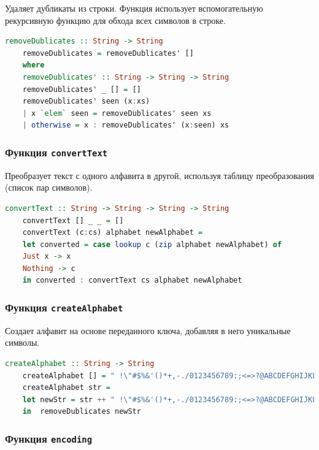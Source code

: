 \documentclass[10pt,a4paper,final]{article} %
\begin{document}
Удаляет дубликаты из строки. Функция использует вспомогательную рекурсивную функцию для обхода всех символов в строке.

\begin{lstlisting}[language=Haskell, caption=Функция удаления дубликатов]
	removeDublicates :: String -> String  
	removeDublicates = removeDublicates' []
	where
	removeDublicates' :: String -> String -> String
	removeDublicates' _ [] = []
	removeDublicates' seen (x:xs)
	| x `elem` seen = removeDublicates' seen xs
	| otherwise = x : removeDublicates' (x:seen) xs
\end{lstlisting}

\subsubsection{Функция \texttt{convertText}}

Преобразует текст с одного алфавита в другой, используя таблицу преобразования (список пар символов).

\begin{lstlisting}[language=Haskell, caption=Функция конвертации текста]
	convertText :: String -> String -> String -> String
	convertText [] _ _ = []
	convertText (c:cs) alphabet newAlphabet =
	let converted = case lookup c (zip alphabet newAlphabet) of
	Just x -> x
	Nothing -> c
	in converted : convertText cs alphabet newAlphabet
\end{lstlisting}

\subsubsection{Функция \texttt{createAlphabet}}

Создает алфавит на основе переданного ключа, добавляя в него уникальные символы.

\begin{lstlisting}[language=Haskell, caption=Функция создания алфавита]
	createAlphabet :: String -> String 
	createAlphabet [] = " !\"#$%&'()*+,-./0123456789:;<=>?@ABCDEFGHIJKLMNOPQRSTUVWXYZ[\\]^_`abcdefghijklmnopqrstuvwxyz{|}"
	createAlphabet str = 
	let newStr = str ++ " !\"#$%&'()*+,-./0123456789:;<=>?@ABCDEFGHIJKLMNOPQRSTUVWXYZ[\\]^_`abcdefghijklmnopqrstuvwxyz{|}"
	in  removeDublicates newStr
\end{lstlisting}

\subsubsection{Функция \texttt{encoding}}
\end{document}
